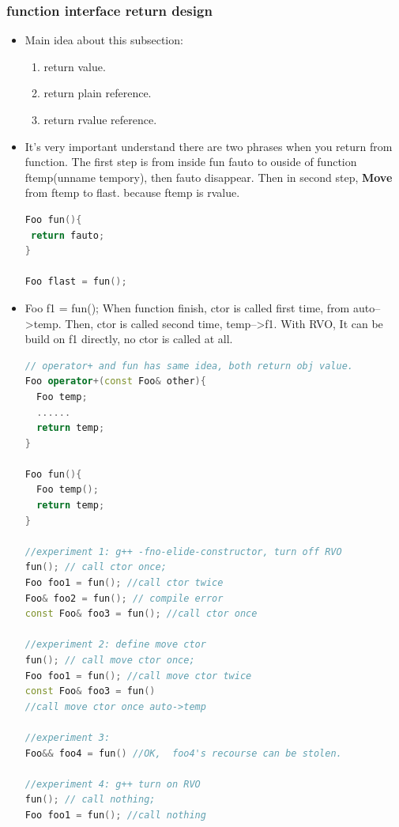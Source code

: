 \documentclass[a4paper,12pt,twoside]{book}
\begin{document}
\subsubsection{function interface return design}
\begin{itemize}
\item Main idea about this subsection:
\begin{enumerate}
\item return value.
\item return plain reference.
\item return rvalue reference.
\end{enumerate}

\item It's very important understand there are two phrases when you return from function. The first step  is from inside fun fauto to ouside of function ftemp(unname tempory), then fauto disappear.  Then in second step, \textbf{Move} from ftemp to flast. because ftemp is rvalue.
\begin{lstlisting}[frame=single, language=c++]
Foo fun(){
 return fauto;
}

Foo flast = fun();
\end{lstlisting}

\item Foo f1 = fun(); When function finish, ctor is called first time, from auto-->temp. Then, ctor is called  second time,  temp-->f1. With RVO, It can be build on f1 directly, no ctor is called at all.
\begin{lstlisting}[frame=single, language=c++]
// operator+ and fun has same idea, both return obj value.
Foo operator+(const Foo& other){
  Foo temp;
  ......
  return temp;
}

Foo fun(){
  Foo temp();
  return temp;
}

//experiment 1: g++ -fno-elide-constructor, turn off RVO
fun(); // call ctor once;
Foo foo1 = fun(); //call ctor twice
Foo& foo2 = fun(); // compile error
const Foo& foo3 = fun(); //call ctor once

//experiment 2: define move ctor
fun(); // call move ctor once;
Foo foo1 = fun(); //call move ctor twice
const Foo& foo3 = fun()
//call move ctor once auto->temp

//experiment 3:
Foo&& foo4 = fun() //OK,  foo4's recourse can be stolen.

//experiment 4: g++ turn on RVO
fun(); // call nothing;
Foo foo1 = fun(); //call nothing
\end{lstlisting}



\end{itemize}
\end{document}

